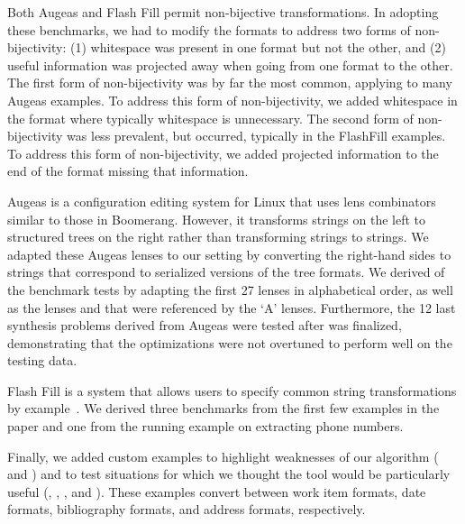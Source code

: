 \documentclass[acmsmall,screen]{acmart}
\begin{document}
Both Augeas and Flash Fill permit non-bijective transformations.  In adopting
these benchmarks, we had to
modify the formats to address two forms of non-bijectivity: (1) whitespace was
present in one format but not the other, and (2) useful information was projected
away when going from one format to the other.  The first form of non-bijectivity
was by far the most common, applying to many Augeas examples.  To address this
form of
non-bijectivity, we added whitespace in the format where typically whitespace is
unnecessary.  The second form of non-bijectivity was less prevalent, but
occurred, typically in the FlashFill examples.  To address this form of
non-bijectivity, we
added projected information to the end of the format missing that information.

Augeas is a configuration editing system for Linux that uses lens
combinators similar to those in Boomerang. However, it transforms
strings on the left to structured trees on the right rather than
transforming strings to strings.
We adapted these Augeas lenses to our setting by converting the
right-hand sides to strings that correspond to serialized versions
of the tree formats.  
We derived \AugeasCount of the benchmark tests by
adapting the first 27 lenses in alphabetical order, as well as the lenses
 and  that were referenced
by the `A' lenses.
Furthermore, the 12 last synthesis problems derived
from Augeas were tested after \Optician{} was
finalized, demonstrating that the optimizations were not
overtuned to perform well on the testing data.

Flash Fill is a system that allows users to specify common string
transformations by example~\cite{gulwani-popl-2014}.  
We derived three benchmarks from the first few examples in the
paper and one from the running example on
extracting phone numbers.

Finally, we added custom examples to highlight weaknesses of
our algorithm ( and ) 
and to test situations for which we thought the tool would be
particularly useful (, , ,
and ).   These examples convert between work item formats, date
formats, bibliography formats, and address formats, respectively.
\end{document}
